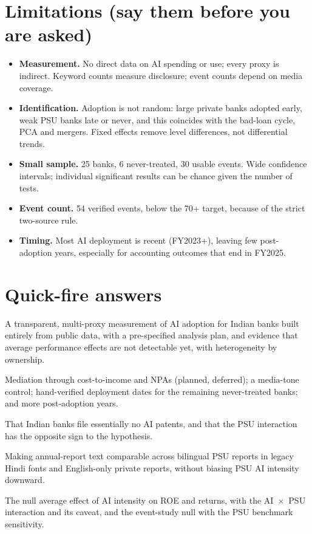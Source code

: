 \documentclass[10.5pt,a4paper]{article}
\newcommand{\q}[2]{\item[``#1'']#2}
\begin{document}
\section{Limitations (say them before you are asked)}
\begin{itemize}
\item \textbf{Measurement.} No direct data on AI spending or use; every proxy is indirect. Keyword counts measure
disclosure; event counts depend on media coverage.
\item \textbf{Identification.} Adoption is not random: large private banks adopted early, weak PSU banks late or never,
and this coincides with the bad-loan cycle, PCA and mergers. Fixed effects remove level differences, not differential
trends.
\item \textbf{Small sample.} 25 banks, 6 never-treated, 30 usable events. Wide confidence intervals; individual
significant results can be chance given the number of tests.
\item \textbf{Event count.} 54 verified events, below the 70+ target, because of the strict two-source rule.
\item \textbf{Timing.} Most AI deployment is recent (FY2023+), leaving few post-adoption years, especially for
accounting outcomes that end in FY2025.
\end{itemize}

\section{Quick-fire answers}
\begin{description}[font=\normalfont\itshape,leftmargin=0pt,style=nextline]
\q{What is your main contribution?}{A transparent, multi-proxy measurement of AI adoption for Indian banks built
entirely from public data, with a pre-specified analysis plan, and evidence that average performance effects are not
detectable yet, with heterogeneity by ownership.}
\q{What would you do with more time?}{Mediation through
cost-to-income and NPAs (planned, deferred); a media-tone control; hand-verified deployment dates for the remaining
never-treated banks; and more post-adoption years.}
\q{What surprised you?}{That Indian banks file essentially no AI patents, and that the PSU interaction has the opposite
sign to the hypothesis.}
\q{What was the hardest data problem?}{Making annual-report text comparable across bilingual PSU reports in legacy Hindi
fonts and English-only private reports, without biasing PSU AI intensity downward.}
\q{Which result would you put on a slide?}{The null average effect of AI intensity on ROE and returns, with the
AI~$\times$~PSU interaction and its caveat, and the event-study null with the PSU benchmark sensitivity.}
\end{description}
\end{document}
